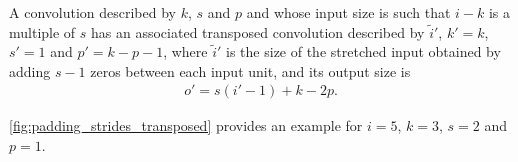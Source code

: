 \documentclass{article}
\begin{document}
\begin{prop}\label{prop:padding_strides_transposed}
A convolution described by $k$, $s$ and $p$ and whose input size is such
that $i - k$ is a multiple of $s$ has an associated transposed convolution
described by $\tilde{i}'$, $k' = k$, $s' = 1$ and $p' = k - p - 1$, where
$\tilde{i}'$ is the size of the stretched input obtained by adding $s - 1$ zeros
between each input unit, and its output size is
\begin{equation*}
\begin{split}
    o' = s (i' - 1) + k - 2p.
\end{split}
\end{equation*}
\end{prop}

\autoref{fig:padding_strides_transposed} provides an example for $i = 5$, $k =
3$, $s = 2$ and $p = 1$.
\end{document}
